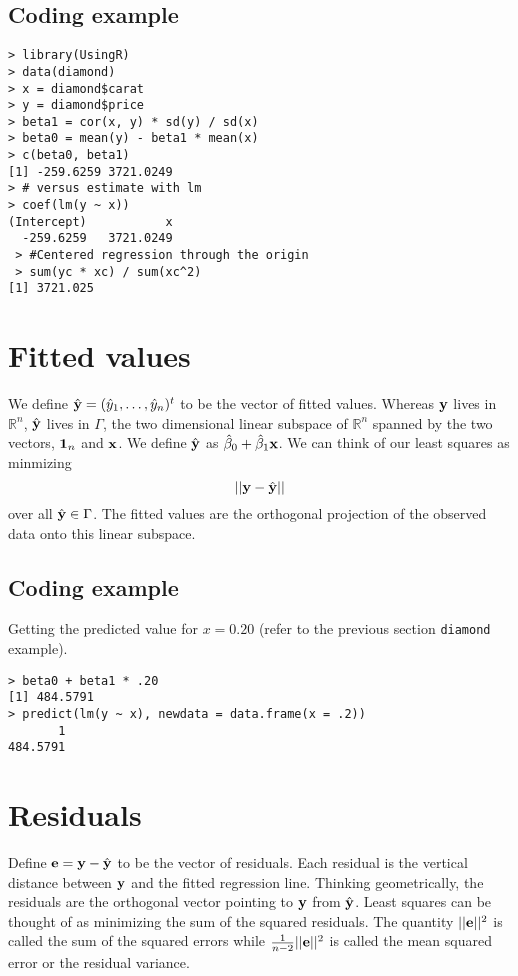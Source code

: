 \subsection{Coding example}
\begin{verbatim}
> library(UsingR)
> data(diamond)
> x = diamond$carat
> y = diamond$price
> beta1 = cor(x, y) * sd(y) / sd(x)
> beta0 = mean(y) - beta1 * mean(x)
> c(beta0, beta1)
[1] -259.6259 3721.0249
> # versus estimate with lm
> coef(lm(y ~ x))
(Intercept)           x 
  -259.6259   3721.0249 
 > #Centered regression through the origin
 > sum(yc * xc) / sum(xc^2)
[1] 3721.025
\end{verbatim}

\section{Fitted values}
We define $\hat {\mathbf{y}} = (\hat y_1, \ldots, \hat y_n)^t$ to be the vector of fitted values.
Whereas $\mathbf{y}$ lives in $\mathbb{R}^n$, $\hat {\mathbf{y}}$ lives in $\Gamma$, the two dimensional
linear subspace of $\mathbb{R}^n$ spanned by the two vectors, $\mathbf{1}_n$ and $\mathbf{x}$. We
define $\hat {\mathbf{y}}$ as $\hat \beta_0 + \hat \beta_1 \mathbf{x}$. We can think of our
least squares as minmizing 
$$
|| \mathbf{y} - \hat {\mathbf{y}}|| 
$$
over all $\hat {\mathbf{y}} \in \Gamma$. The fitted values are the orthogonal projection
of the observed data onto this linear subspace.

\subsection{Coding example}
Getting the predicted value for $x=0.20$ (refer to the previous section \texttt{diamond} example). 
\begin{verbatim}
> beta0 + beta1 * .20
[1] 484.5791
> predict(lm(y ~ x), newdata = data.frame(x = .2))
       1 
484.5791 
\end{verbatim}

\section{Residuals}
Define $\mathbf{e} = \mathbf{y} - \hat {\mathbf{y}}$ to be the vector of residuals. Each residual
is the vertical distance between $\mathbf{y}$ and the fitted regression line. 
Thinking geometrically, the residuals are the orthogonal vector pointing
to $\mathbf{y}$ from $\hat {\mathbf{y}}$. Least squares can be thought of as minimizing
the sum of the squared residuals. The quantity
$||\mathbf{e}||^2 $
is called the sum of the squared errors while $\frac{1}{n-2}||\mathbf{e}||^2$ is
called the mean squared error or the residual variance.

